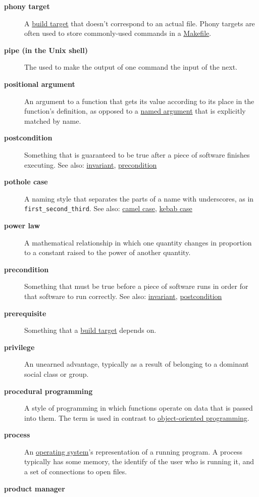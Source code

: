 \documentclass[
]{krantz}
\begin{document}
\begin{description}
\item[\textbf{phony target}]
A \protect\hyperlink{build_target}{build target} that doesn't correspond to an actual file. Phony targets are often used to store commonly-used commands in a \protect\hyperlink{makefile}{Makefile}.
\item[\textbf{pipe (in the Unix shell)}]
The \texttt{\textbar{}} used to make the output of one command the input of the next.
\item[\textbf{positional argument}]
An argument to a function that gets its value according to its place in the function's definition, as opposed to a \protect\hyperlink{named_argument}{named argument} that is explicitly matched by name.
\item[\textbf{postcondition}]
Something that is guaranteed to be true after a piece of software finishes executing. See also: \protect\hyperlink{invariant}{invariant}, \protect\hyperlink{precondition}{precondition}
\item[\textbf{pothole case}]
A naming style that separates the parts of a name with underscores, as in \texttt{first\_second\_third}. See also: \protect\hyperlink{camel_case}{camel case}, \protect\hyperlink{kebab_case}{kebab case}
\item[\textbf{power law}]
A mathematical relationship in which one quantity changes in proportion to a constant raised to the power of another quantity.
\item[\textbf{precondition}]
Something that must be true before a piece of software runs in order for that software to run correctly. See also: \protect\hyperlink{invariant}{invariant}, \protect\hyperlink{postcondition}{postcondition}
\item[\textbf{prerequisite}]
Something that a \protect\hyperlink{build_target}{build target} depends on.
\item[\textbf{privilege}]
An unearned advantage, typically as a result of belonging to a dominant social class or group.
\item[\textbf{procedural programming}]
A style of programming in which functions operate on data that is passed into them. The term is used in contrast to \protect\hyperlink{oop}{object-oriented programming}.
\item[\textbf{process}]
An \protect\hyperlink{operating_system}{operating system}'s representation of a running program. A process typically has some memory, the identify of the user who is running it, and a set of connections to open files.
\item[\textbf{product manager}]

\end{description}
\end{document}
